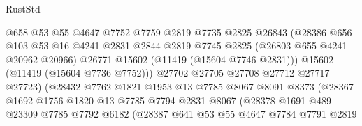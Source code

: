 \begin{lexlean}{RustStd}
\begin{coremodule}
                                @658
                                @53
                                @55
                                @4647
                                @7752
                                @7759
                                @2819
                                @7735
                                @2825
                                @26843
                                (@28386
                                  @656
                                  @103
                                  @53
                                  @16
                                  @4241
                                  @2831
                                  @2844
                                  @2819
                                  @7745
                                  @2825
                                  (@26803 @655 @4241 @20962 @20966)
                                  @26771
                                  @15602
                                  (@11419 (@15604 @7746 @2831)))
                                @15602
                                (@11419 (@15604 @7736 @7752)))
                              @27702
                              @27705
                              @27708
                              @27712
                              @27717
                              @27723)
                            (@28432
                              @7762
                              @1821
                              @1953
                              @13
                              @7785
                              @8067
                              @8091
                              @8373
                              (@28367
                                @1692
                                @1756
                                @1820
                                @13
                                @7785
                                @7794
                                @2831
                                @8067
                                (@28378
                                  @1691
                                  @489
                                  @23309
                                  @7785
                                  @7792
                                  @6182
                                  (@28387
                                    @641
                                    @53
                                    @55
                                    @4647
                                    @7784
                                    @7791
                                    @2819

\end{coremodule}
\end{lexlean}
